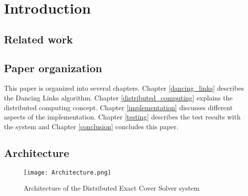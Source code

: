 
\chapter{Introduction}


\section{Related work}


\section{Paper organization}

This paper is organized into several chapters.
Chapter \ref{dancing_links} describes the Dancing Links algorithm.
Chapter \ref{distributed_computing} explains the distributed computing concept.
Chapter \ref{implementation} discusses different aspects of the implementation.
Chapter \ref{testing} describes the test results with the system and Chapter \ref{conclusion} concludes this paper.


\section{Architecture}


\begin{figure}[htb]
	\centering 
	\texttt{[image: Architecture.png]}
	\caption{Architecture of the Distributed Exact Cover Solver system}
	\label{fig:architecture}
\end{figure}

